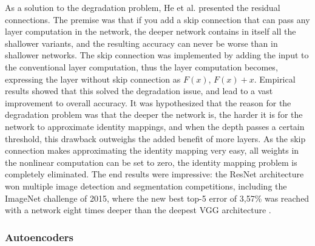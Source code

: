 \documentclass{article}
\begin{document}
As a solution to the degradation problem, He et al. \cite{resnet} presented the residual connections.
The premise was that if you add a skip connection that can pass any layer computation in the network, 
the deeper network contains in itself all the shallower variants, and the resulting accuracy can never 
be worse than in shallower networks. The skip connection was implemented by adding the input to the conventional 
layer computation, thus the layer computation becomes, expressing the layer without skip connection as $F(x)$, 
$F(x) + x$.
Empirical results showed that this solved the degradation issue, and lead to a 
vast improvement to overall accuracy. It was hypothesized that the reason for the degradation problem 
was that the deeper the network is, the harder it is for the network to approximate identity mappings, and when 
the depth passes a certain threshold, this drawback outweighs the added benefit of more layers. As the skip 
connection makes approximating the identity mapping very easy, all weights in the nonlinear computation can 
be set to zero, the identity mapping problem is completely eliminated. The end results were impressive: 
the ResNet architecture won multiple image detection and segmentation competitions, including the ImageNet challenge 
of 2015, where the new best top-5 error of 3,57\% was reached with a network eight times deeper than the deepest VGG architecture \cite{resnet}.

\subsubsection{Autoencoders}
\end{document}
